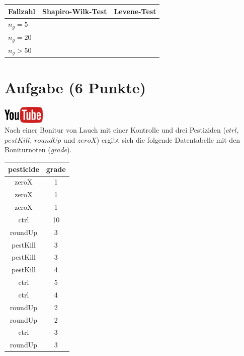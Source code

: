 \documentclass[a4paper, 10pt]{scrartcl}\usepackage[]{graphicx}\usepackage[]{xcolor}
\begin{document}
\begin{center}
  \large
  \begin{tabular}[c]{l|c|c}
  Fallzahl  & Shapiro-Wilk-Test & Levene-Test \strut\\ 
    \hline
    \textbf{$n_g = 5$} & \hspace{4cm} & \hspace{4cm} \strut\\
    \hline
    \textbf{$n_g = 20$} & \hspace{4cm} & \hspace{4cm} \strut\\
    \hline
    \textbf{$n_g > 50$} & \hspace{4cm} & \hspace{4cm} \strut\\
    \hline
  \end{tabular}
\end{center} 
\clearpage

\section{Aufgabe \hfill (6 Punkte)}

\hfill\href{https://youtu.be/knAziLLQGb0}{\includegraphics[width =
  2cm]{img/youtube}}\\[1Ex]



Nach einer Bonitur von Lauch mit einer Kontrolle und drei
Pestiziden ($ctrl$, $pestKill$, $roundUp$ und $zeroX$) ergibt sich die
folgende Datentabelle mit den Boniturnoten (\textit{grade}).

\begin{table}[!h]
\centering
\begin{tabular}{cc}
\toprule
pesticide & grade\\
\midrule
zeroX & 1\\
zeroX & 1\\
zeroX & 1\\
ctrl & 10\\
roundUp & 3\\
\addlinespace
pestKill & 3\\
pestKill & 3\\
pestKill & 4\\
ctrl & 5\\
ctrl & 4\\
\addlinespace
roundUp & 2\\
roundUp & 2\\
ctrl & 3\\
roundUp & 3\\
\bottomrule
\end{tabular}
\end{table}
\end{document}
